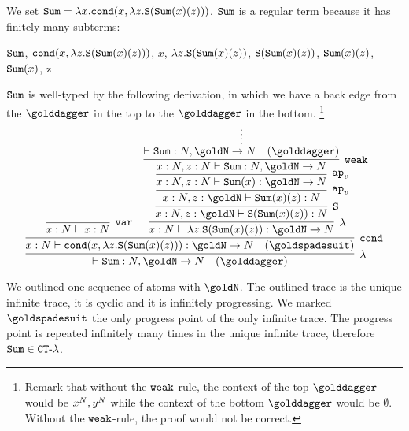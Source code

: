 \begin{Eg}
\label{example-sum}
We set ${\tt Sum} = \lambda x.{\tt cond}(x,\lambda z.{\tt S}({\tt Sum}(x)(z)))$.
${\tt Sum}$ is a regular term because it has finitely many subterms: 
\begin{center}
  ${\tt Sum}$,
  \quad
  ${\tt cond}(x,\lambda z.{\tt S}({\tt Sum}(x)(z)))$,
  \quad
  $x$,
  \quad
  $\lambda z.{\tt S}({\tt Sum}(x)(z))$,
 \quad
  ${\tt S}({\tt Sum}(x)(z))$,
  \quad
  ${\tt Sum}(x)(z)$,
  \quad
  ${\tt Sum}(x)$,
  \quad
   z
\end{center}
${\tt Sum}$ is well-typed by the following derivation, in which we have a back edge 
from the  $\golddagger$ in the top to the $\golddagger$ in the bottom. 
\footnote{Remark that without the ${\tt weak}$-rule, the context of the top
$\golddagger$ would be $x^{N}, y^{N}$ while the context of the 
bottom $\golddagger$ would be $\emptyset$. Without the ${\tt weak}$-rule, the proof would not be correct.}
\[
\infer[\lambda]{
  \vdash \Sum:\N, 
  \goldN
  \rightarrow \N 
   \quad (\golddagger)
}{
  \infer[\cond]{
    x : \N \vdash 
    \cond(x,\lambda z.\Succ(\Sum(x)(z))): \goldN \rightarrow \N
     \quad (\goldspadesuit)
  }{
    \infer[\var]{
      x : \N \vdash x : \N
    }{}
    &
    \infer[\lambda]{
      x:\N \vdash \lambda z.\Succ(\Sum(x)(z)): \goldN \rightarrow \N  
    }{
      \infer[\Succ]{
        x:\N, z : \goldN 
        \vdash \Succ(\Sum(x)(z)): \N  
      }{
        \infer[\apvar]{
          x:\N, z : \goldN 
          \vdash \Sum(x)(z): \N
        }{
          \infer[\apvar]{
            x:\N,  z : \N
            \vdash \Sum(x): \goldN \rightarrow \N
          }{
            \infer[\weak]{
              x:\N,  z : \N
              \vdash \Sum: \N, \goldN \rightarrow  \N
            }{
              \infer*{\vdash \Sum: \N, \goldN \rightarrow \N 
                \quad (\golddagger)}{}
            }
          }
        }
      }
    }
  }
}
\]
\end{Eg}

We %
outlined one sequence of atoms with $\goldN$. The outlined trace is the unique 
infinite trace, it is cyclic and it is infinitely progressing.
We marked $\goldspadesuit$ the only progress point of the only infinite trace.
The progress point is repeated infinitely many times in the unique infinite trace,
therefore ${\tt Sum} \in { {\tt CT}\mbox{-}\lambda}$. 


%


